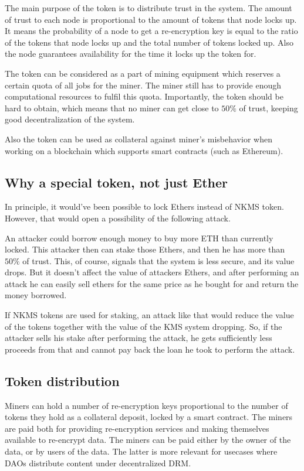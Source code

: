 \documentclass[longbibliography,nofootinbib]{revtex4-1}
\begin{document}
The main purpose of the token is to distribute trust in the system.
The amount of trust to each node is proportional to the amount of tokens that node locks up.
It means the probability of a node to get a re-encryption key is equal to the ratio of the tokens that node locks up and the total number of tokens locked up.
Also the node guarantees availability for the time it locks up the token for.

The token can be considered as a part of mining equipment which reserves a certain quota of all jobs for the miner.
The miner still has to provide enough computational resources to fulfil this quota.
Importantly, the token should be hard to obtain, which means that no miner can get close to $50\%$ of trust, keeping good decentralization of the system.

Also the token can be used as collateral against miner's misbehavior when working on a blockchain which supports smart contracts (such as Ethereum).

\subsection{Why a special token, not just Ether}

In principle, it would've been possible to lock Ethers instead of NKMS token.
However, that would open a possibility of the following attack.

An attacker could borrow enough money to buy more ETH than currently locked.
This attacker then can stake those Ethers, and then he has more than $50\%$ of trust.
This, of course, signals that the system is less secure, and its value drops.
But it doesn't affect the value of attackers Ethers, and after performing an attack he can easily sell ethers for the same price as he bought for and return
the money borrowed.

If NKMS tokens are used for staking, an attack like that would reduce the value of the tokens together with the value of the KMS system dropping.
So, if the attacker sells his stake after performing the attack, he gets sufficiently less proceeds from that and cannot pay back the loan he took to perform
the attack.

\subsection{Token distribution}

Miners can hold a number of re-encryption keys proportional to the number of tokens they hold as a collateral deposit, locked by a smart contract.
The miners are paid both for providing re-encryption services and making themselves available to re-encrypt data.
The miners can be paid either by the owner of the data, or by users of the data.
The latter is more relevant for usecases where DAOs distribute content under decentralized DRM.
\end{document}
